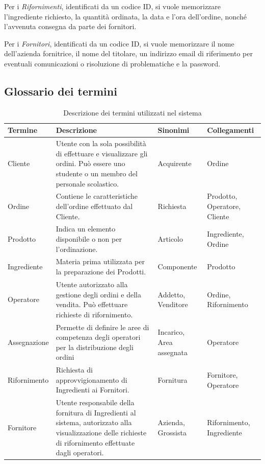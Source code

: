 \documentclass[12pt,a4paper]{article}
\begin{document}
    \vspace{8pt}
    \noindent
    Per i \textit{Rifornimenti}, identificati da un codice ID, si vuole memorizzare l'ingrediente richiesto, la quantità ordinata, la data e l'ora dell'ordine, nonché l'avvenuta consegna da parte dei fornitori.

    \vspace{8pt}
    \noindent
    Per i \textit{Fornitori}, identificati da un codice ID, si vuole memorizzare il nome dell'azienda fornitrice, il nome del titolare, un indirizzo email di riferimento per eventuali comunicazioni o risoluzione di problematiche e la password.

    \subsection{Glossario dei termini}
    \begin{table}[h]
        \renewcommand{\arraystretch}{1.3} %
        \centering
        \begin{tabular}{|m{3cm}|m{6cm}|m{3cm}|m{3cm}|}
            \hline
            \textbf{Termine} & \textbf{Descrizione} & \textbf{Sinonimi} & \textbf{Collegamenti} \\
            \hline
            Cliente & Utente con la sola possibilità di effettuare e visualizzare gli ordini. Può essere uno studente o un membro del personale scolastico. & Acquirente & Ordine \\
            \hline
            Ordine & Contiene le caratteristiche dell'ordine effettuato dal Cliente. & Richiesta & Prodotto, Operatore, Cliente \\
            \hline
            Prodotto & Indica un elemento disponibile o non per l'ordinazione. & Articolo & Ingrediente, Ordine \\
            \hline
            Ingrediente & Materia prima utilizzata per la preparazione dei Prodotti. & Componente & Prodotto \\
            \hline
            Operatore & Utente autorizzato alla gestione degli ordini e della vendita. Può effettuare richieste di rifornimento. & Addetto, Venditore & Ordine, Rifornimento \\
            \hline
            Assegnazione & Permette di definire le aree di competenza degli operatori per la distribuzione degli ordini & Incarico, Area assegnata & Operatore \\
            \hline
            Rifornimento & Richiesta di approvvigionamento di Ingredienti ai Fornitori. & Fornitura & Fornitore, Operatore \\
            \hline
            Fornitore & Utente responsabile della fornitura di Ingredienti al sistema, autorizzato alla visualizzazione delle richieste di rifornimento effettuate dagli operatori. & Azienda, Grossista & Rifornimento, Ingrediente \\
            \hline
        \end{tabular}
        \caption{Descrizione dei termini utilizzati nel sistema}
        \label{tab:termini}
        \vspace{-20pt}
    \end{table}
\end{document}
